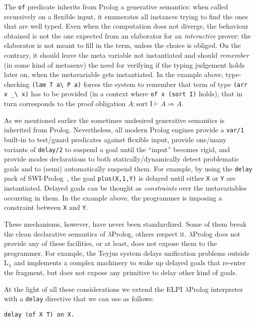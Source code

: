 \documentclass{easychair}
\begin{document}
The \verb+of+ predicate inherits from Prolog a generative semantics:
when called recursively on a flexible input, it enumerates all
instances trying to find the ones that are well typed. Even when 
the computation does not diverge, the behaviour obtained is not the one
expected from an elaborator for an \emph{interactive} prover: the
elaborator is not meant to fill in the term, unless the choice is
obliged. On the contrary, it should leave the meta variable not
instantiated and should \emph{remember} (in some kind of metasenv) the need for verifying if the
typing judgement holds later on, when the metavariable gets instantiated. In
the example above, type-checking \verb+(lam T a\ P a)+ forces the
system to remember that term of type \verb+(arr x _\ x)+ has to be
provided (in a context where \verb+of x (sort I)+ holds), that in turn
corresponds to the proof obligation $A : \mbox{sort I} \vdash A \Rightarrow A $.

As we mentioned earlier the sometimes undesired generative semantics
is inherited from Prolog.
Nevertheless, all modern Prolog engines provide a \verb+var/1+
built-in to test/guard predicates against flexible input, provide
one/many variants of \verb+delay/2+ to suspend a goal until the ``input''
becomes rigid, and provide modes declarations to both
statically/dynamically detect problematic goals and to (semi)
automatically suspend them.
For example, by using the \verb+delay+ pack of SWI-Prolog~\cite{SWI}, the goal
\verb+plus(X,1,Y)+ is delayed until either \verb+X+ or \verb+Y+ are
instantiated.  Delayed goals can be thought as \emph{constraints} over the
metavariables occurring in them. In the example above, the programmer is
imposing a constraint between \verb+X+ and \verb+Y+.

These mechanisms, however, have never been standardized. Some of them
break the clean declarative semantics of $\lambda$Prolog, others
respect it. $\lambda$Prolog does not provide any of these facilities,
or at least, does not expose them to the programmer. For example, the Teyjus
system delays unification problems outside L$_\lambda$ and implements a complex
machinery to wake up delayed goals that re-enter the fragment, but does not
expose any primitive to delay other kind of goals.

At the light of all these considerations we extend the ELPI
$\lambda$Prolog interpreter with a \verb+delay+ directive that we can use
as follows:

\begin{Verbatim}
delay (of X T) on X.
\end{Verbatim}
\end{document}
